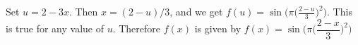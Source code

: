 \relax
{}

\item[{\bf(1)}]

Set $u=2-3x$.  Then $x=(2-u)/3$, and we get $f(u) = \sin\bigl(\pi \bigl(\frac{2-u}{3}\bigr)^2 \bigr)$.  This is true for any value of $u$.
Therefore $f(x)$ is given by $f(x) = \sin\bigl(\pi \bigl(\dfrac{2-x}{3}\bigr)^2 \bigr)$
\bigskip
